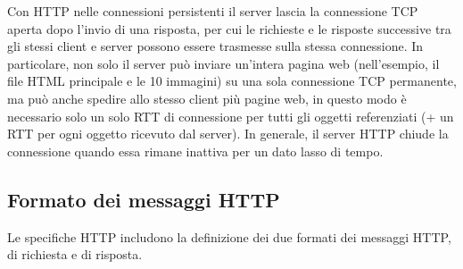 Con HTTP nelle connessioni persistenti il server lascia la connessione TCP aperta dopo l'invio di una risposta, per cui le richieste e le risposte successive tra gli stessi client e server possono essere trasmesse sulla stessa connessione. In particolare, non solo il server può inviare un'intera pagina web (nell'esempio, il file HTML principale e le 10 immagini) su una sola connessione TCP permanente, ma può anche spedire allo stesso client più pagine web, in questo modo è necessario solo un solo RTT di connessione per tutti gli oggetti referenziati (+ un RTT per ogni oggetto ricevuto dal server). In generale, il server HTTP chiude la connessione quando essa rimane inattiva per un dato lasso di tempo.

\subsection{Formato dei messaggi HTTP}
Le specifiche HTTP includono la definizione dei due formati dei messaggi HTTP, di richiesta e di risposta.


